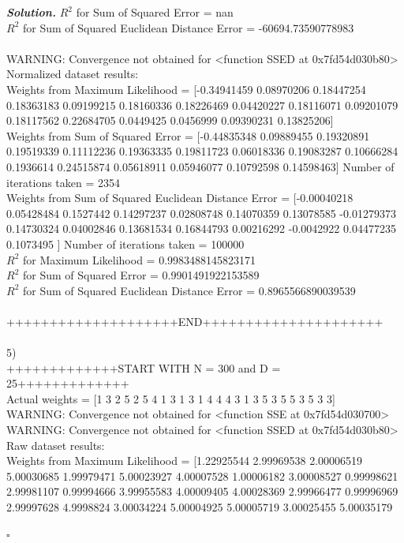 \documentclass[8pt]{article}
\newenvironment{solution}[1][\it{Solution}]{\textbf{#1. } }{$\square$}
\begin{document}
\begin{solution}
$R^2$ for Sum of Squared Error = nan \\
$R^2$ for Sum of Squared Euclidean Distance Error = -60694.73590778983 \\
\\
WARNING: Convergence not obtained for <function SSED at 0x7fd54d030b80>\\
Normalized dataset results:\\
Weights from Maximum Likelihood = [-0.34941459  0.08970206  0.18447254  0.18363183  0.09199215  0.18160336
  0.18226469  0.04420227  0.18116071  0.09201079  0.18117562  0.22684705
  0.0449425   0.0456999   0.09390231  0.13825206] \\
Weights from Sum of Squared Error = [-0.44835348  0.09889455  0.19320891  0.19519339  0.11112236  0.19363335
  0.19811723  0.06018336  0.19083287  0.10666284  0.1936614   0.24515874
  0.05618911  0.05946077  0.10792598  0.14598463] Number of iterations taken =  2354 \\
Weights from Sum of Squared Euclidean Distance Error = [-0.00040218  0.05428484  0.1527442   0.14297237  0.02808748  0.14070359
  0.13078585 -0.01279373  0.14730324  0.04002846  0.13681534  0.16844793
  0.00216292 -0.0042922   0.04477235  0.1073495 ] Number of iterations taken =  100000 \\
$R^2$ for Maximum Likelihood = 0.9983488145823171 \\
$R^2$ for Sum of Squared Error = 0.9901491922153589 \\
$R^2$ for Sum of Squared Euclidean Distance Error = 0.8965566890039539 \\
\\
++++++++++++++++++++END+++++++++++++++++++++\\
\\
5)\\
+++++++++++++START WITH N = 300 and D = 25+++++++++++++\\
Actual weights =  [1 3 2 5 2 5 4 1 3 1 3 1 4 4 4 3 1 3 5 3 5 5 3 5 3 3] \\
WARNING: Convergence not obtained for <function SSE at 0x7fd54d030700>\\
WARNING: Convergence not obtained for <function SSED at 0x7fd54d030b80>\\
Raw dataset results:\\
Weights from Maximum Likelihood = [1.22925544 2.99969538 2.00006519 5.00030685 1.99979471 5.00023927
 4.00007528 1.00006182 3.00008527 0.99998621 2.99981107 0.99994666
 3.99955583 4.00009405 4.00028369 2.99966477 0.99996969 2.99997628
 4.9998824  3.00034224 5.00004925 5.00005719 3.00025455 5.00035179

\end{solution}
\end{document}
